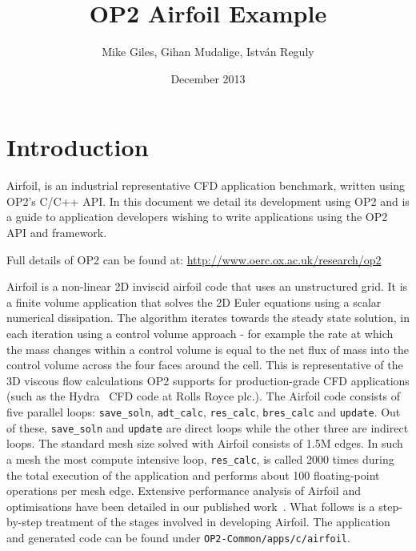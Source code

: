 \documentclass[11pt]{article}
\date{December 2013}
\begin{document}
\title{OP2 Airfoil Example}
\author{Mike Giles, Gihan Mudalige, Istv{\'a}n Reguly}
\maketitle

\newpage




\tableofcontents

\newpage


\newpage
\section{Introduction}

Airfoil, is an industrial representative CFD application benchmark, written using OP2's C/C++ API. In this document we
detail its development using OP2 and is a guide to application developers wishing to write applications using the OP2
API and framework. 

\noindent Full details of OP2 can be found at: \url{http://www.oerc.ox.ac.uk/research/op2}

Airfoil is a non-linear 2D inviscid airfoil code that uses an unstructured grid. It is a finite volume application that
solves the 2D Euler equations using a scalar numerical dissipation. The algorithm iterates towards the steady state
solution, in each iteration using a control volume approach - for example the rate at which the mass changes within a
control volume is equal to the net flux of mass into the control volume across the four faces around the cell. This is
representative of the 3D viscous flow calculations OP2 supports for production-grade CFD applications (such as the
Hydra~\cite{11,12} CFD code at Rolls Royce plc.). The Airfoil code consists of five parallel loops: \texttt{save\_soln},
\texttt{adt\_calc}, \texttt{res\_calc}, \texttt{bres\_calc} and \texttt{update}. Out of these, \texttt{save\_soln} and
\texttt{update} are direct loops while the other three are indirect loops. The standard mesh size solved with Airfoil
consists of 1.5M edges. In such a mesh the most compute intensive loop, \texttt{res\_calc}, is called 2000 times during
the total execution of the application and performs about 100 floating-point operations per mesh edge. Extensive
performance analysis of Airfoil and optimisations have been detailed in our published work~\cite{PER2011, CJ2011,
PER2012, InPar2012}. What follows is a step-by-step treatment of the stages involved in developing Airfoil. The
application and generated code can be found under \texttt{OP2-Common/apps/c/airfoil}.\vspace{-5pt}
\end{document}
